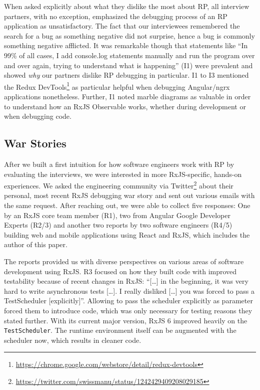 \documentclass[12pt,a4paper]{article}
\begin{document}
When asked explicitly about what they dislike the most about RP, all interview partners, with no exception, emphasized the debugging process of an RP application as unsatisfactory. The fact that our interviewees remembered the search for a bug as something negative did not surprise, hence a bug is commonly something negative afflicted. It was remarkable though that statements like ``In 99\% of all cases, I add console.log statements manually and run the program over and over again, trying to understand what is happening'' (I1) were prevalent and showed \emph{why} our partners dislike RP debugging in particular. I1 to I3 mentioned the Redux DevTools\footnote{\url{https://chrome.google.com/webstore/detail/redux-devtools}} as particular helpful when debugging Angular/ngrx applications nonetheless. Further, I1 noted marble diagrams as valuable in order to understand how an RxJS Observable works, whether during development or when debugging code.

\subsection{War Stories}

After we built a first intuition for how software engineers work with RP by evaluating the interviews, we were interested in more RxJS-specific, hands-on experiences. We asked the engineering community via Twitter\footnote{\url{https://twitter.com/swissmanu/status/1242429409208029185}} about their personal, most recent RxJS debugging war story and sent out various emails with the same request. After reaching out, we were able to collect five responses: One by an RxJS core team member (R1), two from Angular Google Developer Experts (R2/3) and another two reports by two software engineers (R4/5) building web and mobile applications using React and RxJS, which includes the author of this paper.

The reports provided us with diverse perspectives on various areas of software development using RxJS. R3 focused on how they built code with improved testability because of recent changes in RxJS: ``[\dots] in the beginning, it was very hard to write asynchronous tests [\dots]. I really disliked [\dots] you was forced to pass a TestScheduler [explicitly]''. Allowing to pass the scheduler explicitly as parameter forced them to introduce code, which was only necessary for testing reasons they stated further. With its current major version, RxJS 6 improved heavily on the  \texttt{TestScheduler}. The runtime environment itself can be augmented with the scheduler now, which results in cleaner code.
\end{document}
